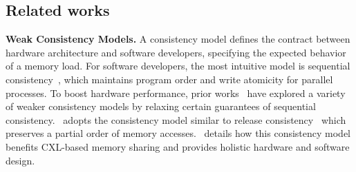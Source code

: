 {%


\subsection{Related works}


\noindent \textbf{Weak Consistency Models.} A consistency model defines the contract between hardware architecture and software developers, specifying the expected behavior of a memory load. For software developers, the most intuitive model is sequential consistency~\cite{lamport_tc79}, which maintains program order and write atomicity for parallel processes. To boost hardware performance, prior works~\cite{rvweak_pact17, rvweak_isca18, spandex_asplos18, lrcgpu_micro16, lrcdsm_isca92} have explored a variety of weaker consistency models by relaxing certain guarantees of sequential consistency. \name~adopts the consistency model similar to release consistency~\cite{threadmarks_tc94, munin_ppopp90, txcache_osdi10, lrcgpu_micro16} which preserves a partial order of memory accesses. \name~details how this consistency model benefits CXL-based memory sharing and provides holistic hardware and software design. 



}
